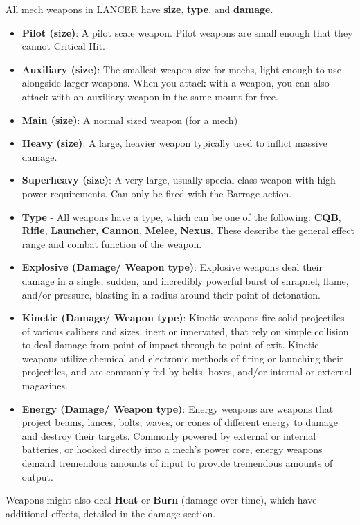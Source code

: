 All mech weapons in LANCER have \textbf{size}, \textbf{type}, and \textbf{damage}. 
\begin{itemize}
\item \textbf{Pilot (size)}: A pilot scale weapon. Pilot weapons are small enough that they cannot Critical Hit. 
\item \textbf{Auxiliary (size)}: The smallest weapon size for mechs, light enough to use alongside larger weapons. When you attack with a weapon, you can also attack with an auxiliary weapon in the same mount for free.
\item \textbf{Main (size)}: A normal sized weapon (for a mech)
\item \textbf{Heavy (size)}: A large, heavier weapon typically used to inflict massive damage.
\item \textbf{Superheavy (size)}: A very large, usually special-class weapon with high power requirements. Can only be fired with the Barrage action. 
\item \textbf{Type} - All weapons have a type, which can be one of the following: \textbf{CQB}, \textbf{Rifle}, \textbf{Launcher}, \textbf{Cannon}, \textbf{Melee}, \textbf{Nexus}. These describe the general effect range and combat function of the weapon. 
\item \textbf{Explosive (Damage/ Weapon type)}: Explosive weapons deal their damage in a single, sudden, and incredibly powerful burst of shrapnel, flame, and/or pressure, blasting in a radius around their point of detonation.
\item \textbf{Kinetic (Damage/ Weapon type)}: Kinetic weapons fire solid projectiles of various calibers and sizes, inert or innervated, that rely on simple collision to deal damage from point-of-impact through to point-of-exit. Kinetic weapons utilize chemical and electronic methods of firing or launching their projectiles, and are commonly fed by belts, boxes, and/or internal or external magazines.
\item \textbf{Energy (Damage/ Weapon type)}: Energy weapons are weapons that project beams, lances, bolts, waves, or cones of different energy to damage and destroy their targets. Commonly powered by external or internal batteries, or hooked directly into a mech's power core, energy weapons demand tremendous amounts of input to provide tremendous amounts of output.
\end{itemize}
Weapons might also deal \textbf{Heat} or \textbf{Burn} (damage over time), which have additional effects, detailed in the damage section.

